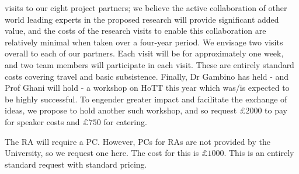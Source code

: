 \documentclass[a4paper,11pt]{article}
\begin{document}
visits to our eight project partners; we believe the active
collaboration of other world leading experts in the proposed research
will provide significant added value, and the costs of the research
visits to enable this collaboration are relatively minimal when taken
over a four-year period. We envisage two visits overall to each of our
partners. Each visit will be for approximately one week, and two team
members will participate in each visit.
These are entirely standard costs covering travel and basic
subsistence. Finally, Dr Gambino has held - and Prof Ghani will hold - a workshop on HoTT
this year which was/is expected to be highly successful. To engender greater impact and
facilitate the exchange of ideas, we propose to hold another such
workshop, and so request $\pounds 2000$ to pay for speaker costs and
$\pounds 750$ for catering.

\vspace{0.02in}

 The RA will require a PC. However, PCs
for RAs are not provided by the University, so we request one
here. The cost for this is $\pounds 1000$. This is an entirely
standard request with standard pricing.
\end{document}
